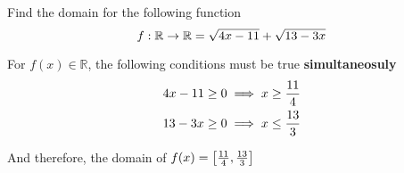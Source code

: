 

\question Find the domain for the following function 
\[
  f:\mathbb{R}\rightarrow\mathbb{R} = \sqrt{4 x - 11} + \sqrt{13 - 3 x}
\]

\watchout

\begin{solution}
  For $f(x)\in\mathbb{R}$, the following conditions must be true \textbf{simultaneosuly}
  \begin{align}
    4 x - 11 \geq 0 &\implies x\geq\frac{11}{4} \\
    13 - 3 x \geq 0 &\implies x\leq\frac{13}{3}
  \end{align}

  And therefore, the domain of $f(x)=\left[ \frac{11}{4}, \frac{13}{3} \right]$
\end{solution}

